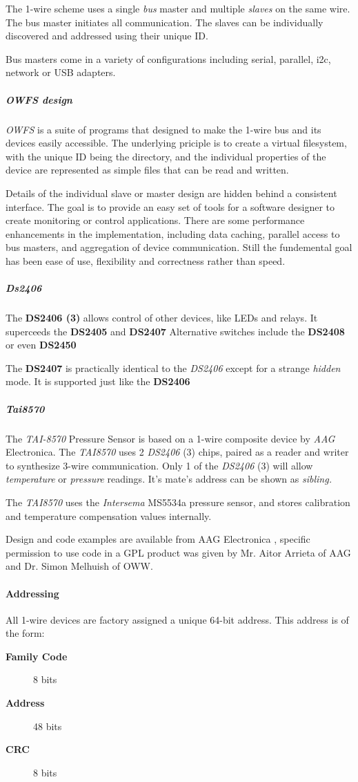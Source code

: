 The 1-wire scheme uses a single  \textit{bus} master and
multiple \textit{slaves} on the same wire. The bus master initiates all communication.
The slaves can be  individually discovered and addressed using their unique
ID. 

Bus masters come in a variety of configurations including serial, parallel,
i2c, network or USB adapters. 
\subparagraph*{OWFS design}\textit{OWFS} is a suite of programs that
designed to make the 1-wire bus and its devices easily accessible. The underlying
priciple is to create a virtual filesystem, with the unique ID being the
directory, and the individual properties of the device are represented
as simple files that can be read and written. 

Details of the individual
slave or master design are hidden behind a consistent interface. The goal
is to  provide an easy set of tools for a software designer to create monitoring
or control applications. There  are some performance enhancements in the
implementation, including data caching, parallel access to bus  masters,
and aggregation of device communication. Still the fundemental goal has
been ease of use, flexibility  and correctness rather than speed.  
\subparagraph*{Ds2406}The
\textsf{\textbf{DS2406 (3)}} allows control of other devices, like LEDs and relays. It superceeds
the \textbf{DS2405} and \textbf{DS2407} Alternative switches include the \textbf{DS2408} or even \textbf{DS2450}


The \textbf{DS2407} is practically identical to the \textit{DS2406} except for a strange
\textit{hidden} mode. It is supported just like the \textbf{DS2406} 
\subparagraph*{Tai8570}The \textit{TAI-8570} Pressure
Sensor is based on a 1-wire composite device by \textit{AAG} Electronica. The \textit{TAI8570}
uses 2 \textsf{\textit{DS2406} (3)} chips, paired as a reader and writer to synthesize 3-wire
communication. Only 1 of the \textsf{\textit{DS2406} (3)} will allow \textit{temperature} or \textit{pressure}
readings. It's mate's address can be shown as \textit{sibling.} 

The \textit{TAI8570} uses the
\textit{Intersema} MS5534a pressure sensor, and stores calibration and temperature
compensation values internally. 

Design and code examples are available from
AAG Electronica  , specific permission to use code in a
GPL product was given by Mr. Aitor Arrieta of AAG and Dr. Simon Melhuish
of OWW. 
\paragraph*{Addressing}
          All 1-wire devices are factory assigned a unique
64-bit address. This address is of the form: \begin{description}
\item [\textbf{Family Code} ] 8 bits 
\item [\textbf{Address} ] 48
bits 
\item [\textbf{CRC} ] 8 bits 
\end{description}


